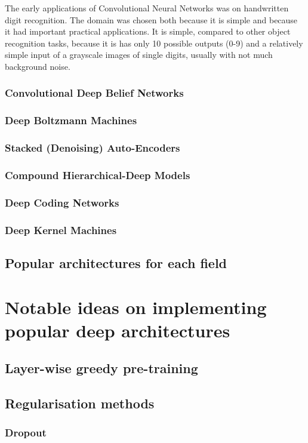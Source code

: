 \documentclass[]{article}
\begin{document}
			The early applications of Convolutional Neural Networks was on handwritten digit recognition. The domain was chosen both because it is simple and because it had important practical applications. It is simple, compared to other object recognition tasks, because it is has only 10 possible outputs (0-9) and a relatively simple input of a grayscale images of single digits, usually with not much background noise.
			
		\subsubsection{Convolutional Deep Belief Networks}
		\subsubsection{Deep Boltzmann Machines}
		\subsubsection{Stacked (Denoising) Auto-Encoders}
		\subsubsection{Compound Hierarchical-Deep Models}
		\subsubsection{Deep Coding Networks}
		\subsubsection{Deep Kernel Machines}
	\subsection{Popular architectures for each field}
\section{Notable ideas on implementing popular deep architectures}
	\subsection{Layer-wise greedy pre-training}
	\subsection{Regularisation methods}
		\subsubsection{Dropout}
\end{document}
